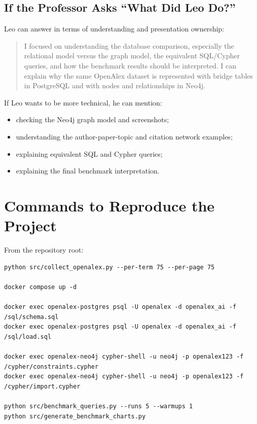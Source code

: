 \documentclass[11pt]{article}
\begin{document}
\subsection{If the Professor Asks ``What Did Leo Do?''}

Leo can answer in terms of understanding and presentation ownership:

\begin{quote}
I focused on understanding the database comparison, especially the relational model versus the graph model, the equivalent SQL/Cypher queries, and how the benchmark results should be interpreted. I can explain why the same OpenAlex dataset is represented with bridge tables in PostgreSQL and with nodes and relationships in Neo4j.
\end{quote}

If Leo wants to be more technical, he can mention:

\begin{itemize}
    \item checking the Neo4j graph model and screenshots;
    \item understanding the author-paper-topic and citation network examples;
    \item explaining equivalent SQL and Cypher queries;
    \item explaining the final benchmark interpretation.
\end{itemize}

\section{Commands to Reproduce the Project}

From the repository root:

\begin{verbatim}
python src/collect_openalex.py --per-term 75 --per-page 75

docker compose up -d

docker exec openalex-postgres psql -U openalex -d openalex_ai -f /sql/schema.sql
docker exec openalex-postgres psql -U openalex -d openalex_ai -f /sql/load.sql

docker exec openalex-neo4j cypher-shell -u neo4j -p openalex123 -f /cypher/constraints.cypher
docker exec openalex-neo4j cypher-shell -u neo4j -p openalex123 -f /cypher/import.cypher

python src/benchmark_queries.py --runs 5 --warmups 1
python src/generate_benchmark_charts.py
\end{verbatim}
\end{document}

